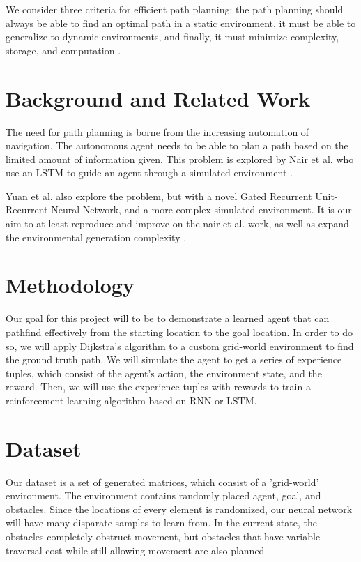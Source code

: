 \documentclass[sigplan,screen]{acmart}
\begin{document}
We consider three criteria for efficient path planning: the path planning should
always be able to find an optimal path in a static environment, it must be able
to generalize to dynamic environments, and finally, it must minimize complexity,
storage, and computation \cite{janet_essential_1995}.

\section{Background and Related Work}
The need for path planning is borne from the increasing automation of
navigation. The autonomous agent needs to be able to plan a path based on the
limited amount of information given. This problem is explored by Nair et al. who
use an LSTM to guide an agent through a simulated environment
\cite{nair_robotic_2020}.

Yuan et al. also explore the problem, but with a novel Gated Recurrent
Unit-Recurrent Neural Network, and a more complex simulated environment. It is
our aim to at least reproduce and improve on the nair et al. work, as well as
expand the environmental generation complexity \cite{yuan_novel_2019}.

\section{Methodology}
Our goal for this project will to be to demonstrate a learned agent that can
pathfind effectively from the starting location to the goal location. In order
to do so, we will apply Dijkstra's algorithm to a custom grid-world environment
to find the ground truth path. We will simulate the agent to get a series of
experience tuples, which consist of the agent's action, the environment state,
and the reward. Then, we will use the experience tuples with rewards to train a
reinforcement learning algorithm based on RNN or LSTM.

\section{Dataset}
Our dataset is a set of generated matrices, which consist of a 'grid-world'
environment. The environment contains randomly placed agent, goal, and
obstacles. Since the locations of every element is randomized, our neural
network will have many disparate samples to learn from. In the current state,
the obstacles completely obstruct movement, but obstacles that have variable
traversal cost while still allowing movement are also planned.
\end{document}
